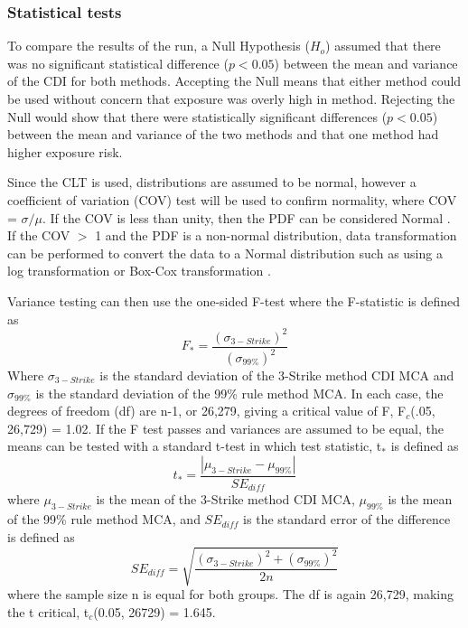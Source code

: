 \subsubsection{Statistical tests}

To compare the results of the run, a Null Hypothesis ($H_{o}$) assumed that there was no significant statistical difference ($p<0.05$) between the mean and variance of the CDI for both methods. Accepting the Null means that either method could be used without concern that exposure was overly high in method. Rejecting the Null would show that there were statistically significant differences ($p<0.05$) between the mean and variance of the two methods and that one method had higher exposure risk. 

Since the CLT is used, distributions are assumed to be normal, however a coefficient of variation (COV) test will be used to confirm normality, where COV = $\sigma/\mu$. If the COV is less than unity, then the PDF can be considered Normal \citep{Abdi2010}.  If the COV $>$ 1 and the PDF is a non-normal distribution, data transformation can be performed to convert the data to a Normal distribution such as using a log transformation or Box-Cox transformation \citep{Osborne2010}.

Variance testing can then use the one-sided F-test where the F-statistic is defined as
%
\begin{equation}
\label{eq6:ftest}
F_{*} = \frac{(\sigma_{3-Strike})^{2}}{(\sigma_{99\%})^{2}}
\end{equation}
%
Where $\sigma_{3-Strike}$ is the standard deviation of the 3-Strike method CDI MCA and $\sigma_{99\%}$ is the standard deviation of the 99\% rule method MCA. In each case, the degrees of freedom (df) are n-1, or 26,279, giving a critical value of F, F$_{c}$(.05, 26,729) = 1.02. If the F test passes and variances are assumed to be equal, the means can be tested with a standard t-test in which test statistic, t$_{*}$ is defined as
%
\begin{equation}
\label{eq7:t-test}
t_{*} = \frac{\left | \mu_{3-Strike}-\mu_{99\%} \right |}{SE_{diff}}
\end{equation}
%
\noindent
where $\mu_{3-Strike}$ is the mean of the 3-Strike method CDI MCA, $\mu_{99\%}$ is the mean of the 99\% rule method MCA, and $SE_{diff}$ is the standard error of the difference is defined as
%
\begin{equation}
\label{eq8:SEdiff}
SE_{diff} = \sqrt{\frac{(\sigma_{3-Strike})^{2}+(\sigma_{99\%})^{2}}{2n}}
\end{equation}
%
\noindent
where the sample size n is equal for both groups. The df is again 26,729, making the t critical, t$_{c}$(0.05, 26729) = 1.645.

